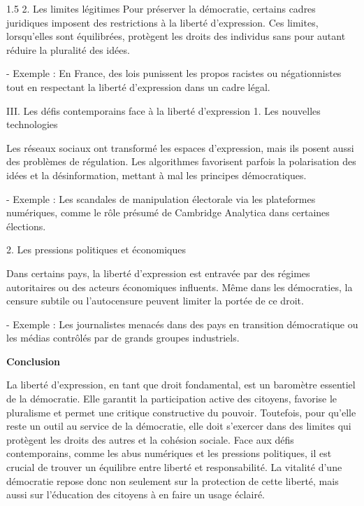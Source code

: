 \documentclass[12pt]{article}
\begin{document}
\begin{spacing}{1.5}
2. Les limites légitimes  
   Pour préserver la démocratie, certains cadres juridiques imposent des restrictions à la liberté d'expression. Ces limites, lorsqu'elles sont équilibrées, protègent les droits des individus sans pour autant réduire la pluralité des idées. 
   
   - Exemple : En France, des lois punissent les propos racistes ou négationnistes tout en respectant la liberté d'expression dans un cadre légal.

III. Les défis contemporains face à la liberté d'expression
1. Les nouvelles technologies
  
   Les réseaux sociaux ont transformé les espaces d'expression, mais ils posent aussi des problèmes de régulation. Les algorithmes favorisent parfois la polarisation des idées et la désinformation, mettant à mal les principes démocratiques. 
   
   - Exemple : Les scandales de manipulation électorale via les plateformes numériques, comme le rôle présumé de Cambridge Analytica dans certaines élections.  

2. Les pressions politiques et économiques
 
   Dans certains pays, la liberté d'expression est entravée par des régimes autoritaires ou des acteurs économiques influents. Même dans les démocraties, la censure subtile ou l'autocensure peuvent limiter la portée de ce droit. 
   
   - Exemple : Les journalistes menacés dans des pays en transition démocratique ou les médias contrôlés par de grands groupes industriels.



\textbf{Conclusion}

La liberté d'expression, en tant que droit fondamental, est un baromètre essentiel de la démocratie. Elle garantit la participation active des citoyens, favorise le pluralisme et permet une critique constructive du pouvoir. Toutefois, pour qu'elle reste un outil au service de la démocratie, elle doit s'exercer dans des limites qui protègent les droits des autres et la cohésion sociale. Face aux défis contemporains, comme les abus numériques et les pressions politiques, il est crucial de trouver un équilibre entre liberté et responsabilité. La vitalité d'une démocratie repose donc non seulement sur la protection de cette liberté, mais aussi sur l'éducation des citoyens à en faire un usage éclairé.




\quad
\quad


\end{spacing}
\end{document}
